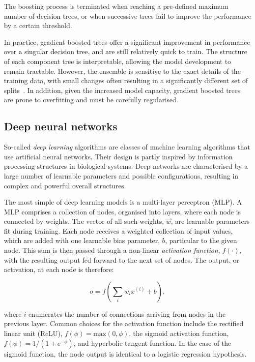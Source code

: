 \noindent The boosting process is terminated when reaching a pre-defined maximum number of decision trees, or when successive trees fail to improve the performance by a certain threshold.


In practice, gradient boosted trees offer a significant improvement in performance over a singular decision tree, and are still relatively quick to train. The structure of each component tree is interpretable, allowing the model development to remain tractable. However, the ensemble is sensitive to the exact details of the training data, with small changes often resulting in a significantly different set of splits~\cite{statistical_learning}. In addition, given the increased model capacity, gradient boosted trees are prone to overfitting and must be carefully regularised.

\subsection{Deep neural networks}


So-called \textit{deep learning} algorithms are classes of machine learning algorithms that use artificial neural networks. Their design is partly inspired by information processing structures in biological systems. Deep networks are characterised by a large number of learnable parameters and possible configurations, resulting in complex and powerful overall structures.

The most simple of deep learning models is a multi-layer perceptron (MLP). 
A MLP comprises a collection of nodes, organised into layers, where each node is connected by weights. The vector of all such weights, $\vec{w}$, are learnable parameters fit during training. Each node receives a weighted collection of input values, which are added with one learnable bias parameter, $b$, particular to the given node. This sum is then passed through a non-linear \textit{activation function}, $f(\cdot)$, with the resulting output fed forward to the next set of nodes. The output, or activation, at each node is therefore:

\begin{equation}
    o = f\left(\sum_{i}w_{i}x^{(i)} + b\right), %
\end{equation}
    
\noindent where $i$ enumerates the number of connections arriving from nodes in the previous layer. Common choices for the activation function include the rectified linear unit (ReLU), $f(\phi)=\mathrm{max}(0,\phi)$,  the sigmoid activation function, $f(\phi)=1/(1+e^{-\phi})$, and hyperbolic tangent function. In the case of the sigmoid function, the node output is identical to a logistic regression hypothesis.

